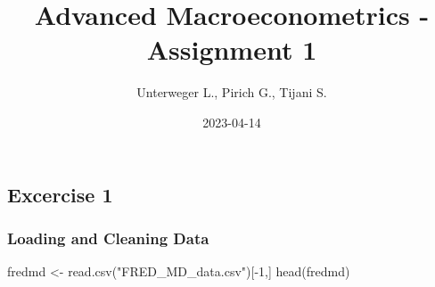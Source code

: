 \documentclass[
]{article}
\title{Advanced Macroeconometrics - Assignment 1}
\author{Unterweger L., Pirich G., Tijani S.}
\date{2023-04-14}
\newenvironment{Shaded}{\begin{snugshade}}{\end{snugshade}}
\newcommand{\DecValTok}[1]{\textcolor[rgb]{0.00,0.00,0.81}{#1}}
\newcommand{\FunctionTok}[1]{\textcolor[rgb]{0.00,0.00,0.00}{#1}}
\newcommand{\NormalTok}[1]{#1}
\newcommand{\OtherTok}[1]{\textcolor[rgb]{0.56,0.35,0.01}{#1}}
\newcommand{\SpecialCharTok}[1]{\textcolor[rgb]{0.00,0.00,0.00}{#1}}
\newcommand{\StringTok}[1]{\textcolor[rgb]{0.31,0.60,0.02}{#1}}
\begin{document}
\maketitle

\hypertarget{excercise-1}{%
\subsection{Excercise 1}\label{excercise-1}}

\hypertarget{loading-and-cleaning-data}{%
\subsubsection{Loading and Cleaning
Data}\label{loading-and-cleaning-data}}

\begin{Shaded}
\begin{Highlighting}[]
\NormalTok{fredmd }\OtherTok{\textless{}{-}} \FunctionTok{read.csv}\NormalTok{(}\StringTok{"FRED\_MD\_data.csv"}\NormalTok{)[}\SpecialCharTok{{-}}\DecValTok{1}\NormalTok{,]}
\FunctionTok{head}\NormalTok{(fredmd)}
\end{Highlighting}
\end{Shaded}
\end{document}
